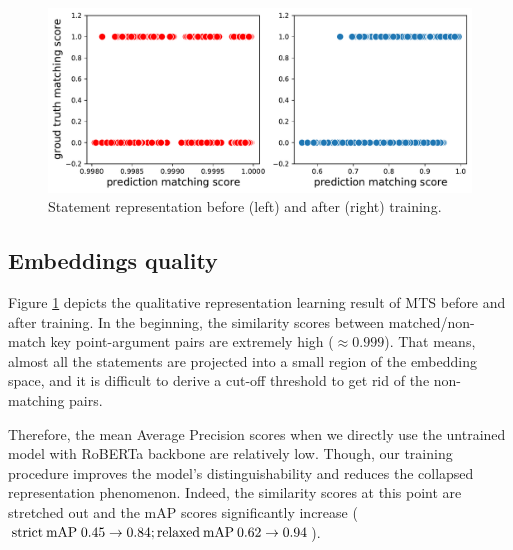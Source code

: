 \begin{figure}[ht]
\centering
\includegraphics[scale=0.35]{figures/before-after.pdf}
\caption{Statement representation before (left) and after (right) training.}
\label{fig:before-after}
\end{figure}

\subsection{Embeddings quality}

Figure \ref{fig:before-after} depicts the qualitative representation learning result of MTS before and after training. In the beginning, the similarity scores between matched/non-match key point-argument pairs are extremely high ($\approx0.999$). That means, almost all the statements are projected into a small region of the embedding space, and it is difficult to derive a cut-off threshold to get rid of the non-matching pairs.

Therefore, the mean Average Precision scores when we directly use the untrained model with RoBERTa backbone are relatively low. Though, our training procedure improves the model's distinguishability and reduces the collapsed representation phenomenon. Indeed, the similarity scores at this point are stretched out and the mAP scores significantly increase ($\text{strict\:mAP}\;0.45\to0.84;\\ \text{relaxed\:mAP}\:0.62\to0.94$).

